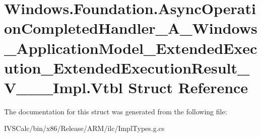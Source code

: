 \hypertarget{struct_windows_1_1_foundation_1_1_async_operation_completed_handler___a___windows___application_f03dc033e92ec4edad3e12e98c71f3ca}{}\section{Windows.\+Foundation.\+Async\+Operation\+Completed\+Handler\+\_\+\+A\+\_\+\+Windows\+\_\+\+Application\+Model\+\_\+\+Extended\+Execution\+\_\+\+Extended\+Execution\+Result\+\_\+\+V\+\_\+\+\_\+\+\_\+\+Impl.\+Vtbl Struct Reference}
\label{struct_windows_1_1_foundation_1_1_async_operation_completed_handler___a___windows___application_f03dc033e92ec4edad3e12e98c71f3ca}


The documentation for this struct was generated from the following file\+:\begin{DoxyCompactItemize}
\item 
I\+V\+S\+Calc/bin/x86/\+Release/\+A\+R\+M/ilc/Impl\+Types.\+g.\+cs\end{DoxyCompactItemize}
